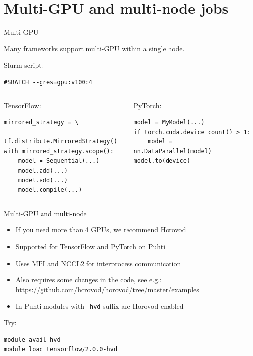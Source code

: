 \documentclass[aspectratio=1610,14pt]{beamer}
\newcommand{\link}[1]{\alert{\url{#1}}}
\begin{document}
\section{Multi-GPU and multi-node jobs}

\begin{frame}[fragile]{Multi-GPU}

  Many frameworks support multi-GPU within a single node.

  \vspace{0.5em}
  
  Slurm script:
  \begin{verbatim}
#SBATCH --gres=gpu:v100:4
  \end{verbatim}

  \vspace{0.5em}
  
  \begin{columns}[t]
    \begin{column}{0.47\linewidth}
      TensorFlow:
      
      \begin{verbatim}
mirrored_strategy = \
  tf.distribute.MirroredStrategy()
with mirrored_strategy.scope():
    model = Sequential(...)
    model.add(...)
    model.add(...)
    model.compile(...)
      \end{verbatim}
    \end{column}
    \begin{column}{0.47\linewidth}
      PyTorch:
      
      \begin{verbatim}
model = MyModel(...)
if torch.cuda.device_count() > 1:
    model = nn.DataParallel(model)
model.to(device)
      \end{verbatim}
    \end{column}
  \end{columns}
\end{frame}

\begin{frame}[fragile]{Multi-GPU and multi-node}
  \begin{itemize}
  \item If you need more than 4 GPUs, we recommend \alert{Horovod}
  \item Supported for TensorFlow and PyTorch on Puhti
  \item Uses MPI and NCCL2 for interprocess communication
  \item Also requires some changes in the code, see e.g.: \\
    {\small \link{https://github.com/horovod/horovod/tree/master/examples}}
  \item In Puhti modules with {\tt -hvd} suffix are Horovod-enabled
  \end{itemize}

  \vspace{0.7em}

  Try: \vspace{-2mm}
\begin{verbatim}
module avail hvd
module load tensorflow/2.0.0-hvd
\end{verbatim}
\end{frame}
\end{document}
